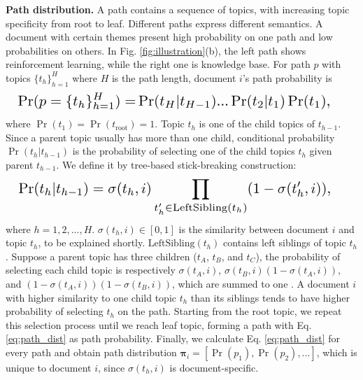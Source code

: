 \textbf{Path distribution.} A path contains a sequence of topics, with increasing topic specificity from root to leaf. Different paths express different semantics. A document with certain themes present high probability on one path and low probabilities on others. In Fig. \ref{fig:illustration}(b), the left path shows reinforcement learning, while the right one is knowledge base. For path $ p $ with topics $ \{t_h\}_{h=1}^H $ where $ H $ is the path length, document $ i $'s path probability is
\begin{equation}
\label{eq:path_dist}
\resizebox{1\columnwidth}{!}{
$ \begin{split}
    \Pr(p=\{t_h\}_{h=1}^H)=&\Pr(t_H|t_{H-1})...\Pr(t_2|t_1)\Pr(t_1),%
\end{split} $
}
\end{equation}
where $ \Pr(t_1)=\Pr(t_{\text{root}})=1 $. Topic $ t_h $ is one of the child topics of $ t_{h-1} $. Since a parent topic usually has more than one child, conditional probability $ \Pr(t_h|t_{h-1}) $ is the probability of selecting one of the child topics $ t_h $ given parent $ t_{h-1} $. We define it by tree-based stick-breaking construction:
\begin{equation}
\label{eq:path_dist_conditional_prob}
\resizebox{1\columnwidth}{!}{
$ \begin{split}
    \Pr(t_h|t_{h-1})=\sigma(t_h,i)&\prod_{t_h^\prime\in\text{LeftSibling}(t_h)}(1-\sigma(t_h^\prime,i)),%
\end{split} $
}
\end{equation}
where $ h=1,2,...,H $. $ \sigma(t_h,i)\in[0,1] $ is the similarity between document $ i $ and topic $ t_h $, to be explained shortly. $ \text{LeftSibling}(t_h) $ contains left siblings of topic $ t_h $. Suppose a parent topic has three children ($ t_A $, $ t_B $, and $ t_C $), the probability of selecting each child topic is respectively $ \sigma(t_A,i) $, $ \sigma(t_B,i)(1-\sigma(t_A,i)) $, and $ (1-\sigma(t_A,i))(1-\sigma(t_B,i)) $, which are summed to one \cite{tsntm}. A document $ i $ with higher similarity to one child topic $ t_h $ than its siblings tends to have higher probability of selecting $ t_h $ on the path. Starting from the root topic, we repeat this selection process until we reach leaf topic, forming a path with Eq. \ref{eq:path_dist} as path probability. Finally, we calculate Eq. \ref{eq:path_dist} for every path and obtain path distribution $ \bm{\pi}_i=[\Pr(p_1),\Pr(p_2),...] $, which is unique to document $ i $, since $ \sigma(t_h,i) $ is document-specific.

